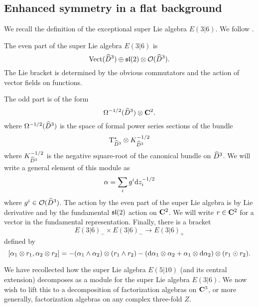 \subsection{Enhanced symmetry in a flat background}

\parsec[s:e36]

We recall the definition of the exceptional super Lie algebra $E(3|6)$. 
We follow \cite{Kac_class, KacRudakov}.

The even part of the super Lie algebra $E(3|6)$ is 
\[
\Vect(\Hat{D}^3) \oplus \lie{sl}(2) \otimes \cO(\Hat{D}^3) .
\]
The Lie bracket is determined by the obvious commutators and the action of vector fields on functions. 

The odd part is of the form
\[
\Omega^{-1/2}(\Hat{D}^3) \otimes \C^2 .
\]
where $\Omega^{-1/2}(\Hat{D}^3)$ is the space of formal power series sections of the bundle
\[
\T_{\Hat{D}^3}^{*} \otimes K_{\Hat{D}^3}^{-1/2}
\]
where $K_{\Hat{D}^3}^{-1/2}$ is the negative square-root of the canonical bundle on $\Hat{D}^3$. 
We will write a general element of this module as 
\[
\alpha = \sum_i g^i \d z_i^{-1/2} 
\]
where $g^i \in \cO(\Hat{D}^3)$. 
The action by the even part of the super Lie algebra is by Lie derivative and by the fundamental $\lie{sl}(2)$ action on $\C^2$.
We will write $r \in \C^2$ for a vector in the fundamental representation.
Finally, there is a bracket 
\[
E(3|6)_- \times E(3|6)_- \to E(3|6)_+
\]
defined by
\[
[\alpha_1 \otimes r_1, \alpha_2 \otimes r_2] = - (\alpha_1 \wedge \alpha_2) \otimes (r_1 \wedge r_2) - (\d \alpha_1 \otimes \alpha_2 + \alpha_1 \otimes \d \alpha_2) \otimes (r_1 \odot r_2) .
\]


\parsec[s:weight]


\parsec[s:locallieE510]

We have recollected how the super Lie algebra $E(5|10)$ (and its central extension) decomposes as a module for the super Lie algebra $E(3|6)$. 
We now wish to lift this to a decomposition of factorization algebras on $\C^3$, or more generally, factorization algebras on any complex three-fold $Z$. 

